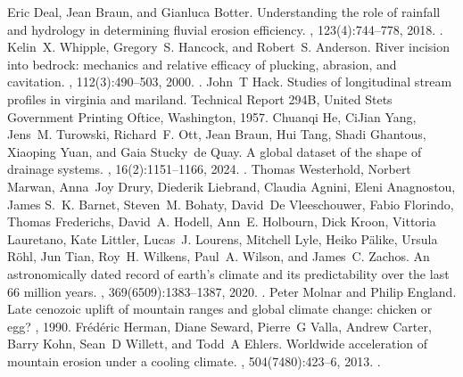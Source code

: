 \documentclass[letterpaper,10pt,english]{jupyterBook}
\begin{document}
\begin{sphinxthebibliography}{10}
\sphinxAtStartPar
Eric Deal, Jean Braun, and Gianluca Botter. Understanding the role of rainfall and hydrology in determining fluvial erosion efficiency. , 123(4):744–778, 2018. .
\sphinxAtStartPar
Kelin X. Whipple, Gregory S. Hancock, and Robert S. Anderson. River incision into bedrock: mechanics and relative efficacy of plucking, abrasion, and cavitation. , 112(3):490–503, 2000. .
\sphinxAtStartPar
John T Hack. Studies of longitudinal stream profiles in virginia and mariland. Technical Report 294\sphinxhyphen{}B, United Stets Government Printing Oftice, Washington, 1957.
\sphinxAtStartPar
Chuanqi He, Ci\sphinxhyphen{}Jian Yang, Jens M. Turowski, Richard F. Ott, Jean Braun, Hui Tang, Shadi Ghantous, Xiaoping Yuan, and Gaia Stucky de Quay. A global dataset of the shape of drainage systems. , 16(2):1151–1166, 2024. .
\sphinxAtStartPar
Thomas Westerhold, Norbert Marwan, Anna Joy Drury, Diederik Liebrand, Claudia Agnini, Eleni Anagnostou, James S. K. Barnet, Steven M. Bohaty, David De Vleeschouwer, Fabio Florindo, Thomas Frederichs, David A. Hodell, Ann E. Holbourn, Dick Kroon, Vittoria Lauretano, Kate Littler, Lucas J. Lourens, Mitchell Lyle, Heiko Pälike, Ursula Röhl, Jun Tian, Roy H. Wilkens, Paul A. Wilson, and James C. Zachos. An astronomically dated record of earth’s climate and its predictability over the last 66 million years. , 369(6509):1383–1387, 2020. .
\sphinxAtStartPar
Peter Molnar and Philip England. Late cenozoic uplift of mountain ranges and global climate change: chicken or egg? , 1990.
\sphinxAtStartPar
Frédéric Herman, Diane Seward, Pierre G Valla, Andrew Carter, Barry Kohn, Sean D Willett, and Todd A Ehlers. Worldwide acceleration of mountain erosion under a cooling climate. , 504(7480):423–6, 2013. .

\end{sphinxthebibliography}
\end{document}
